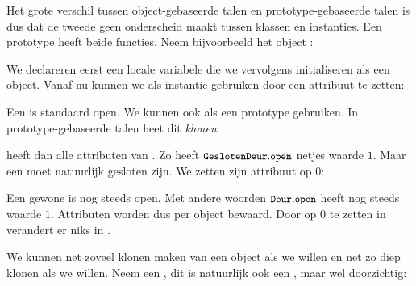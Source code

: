 Het grote verschil tussen object-gebaseerde talen en prototype-gebaseerde talen is dus dat de tweede geen onderscheid maakt tussen klassen en instanties. Een prototype heeft beide functies. Neem bijvoorbeeld het object :

\newCodeFragment

\begin{codelines}
\end{codelines}

We declareren eerst een locale variabele die we vervolgens initialiseren als een object. Vanaf nu kunnen we  als instantie gebruiken door een attribuut te zetten:

\begin{codelines}
\end{codelines}

Een  is standaard open. We kunnen  ook als een prototype gebruiken. In prototype-gebaseerde talen heet dit \emph{klonen}:

\begin{codelines}
\end{codelines}

 heeft dan alle attributen van . Zo heeft $\text{\ttfamily\small\upshape GeslotenDeur}.\text{\ttfamily\small\upshape open}$ netjes waarde $1$.
Maar een  moet natuurlijk gesloten zijn. We zetten zijn attribuut  op $0$:

\begin{codelines}
\end{codelines}

Een gewone  is nog steeds open. Met andere woorden $\text{\ttfamily\small\upshape Deur}.\text{\ttfamily\small\upshape open}$ heeft nog steeds waarde $1$.
Attributen worden dus per object bewaard. Door  op $0$ te zetten in  verandert er niks in .

We kunnen net zoveel klonen maken van een object als we willen en net zo diep klonen als we willen. Neem een , dit is natuurlijk ook een , maar wel doorzichtig:

\begin{codelines}
\end{codelines}

